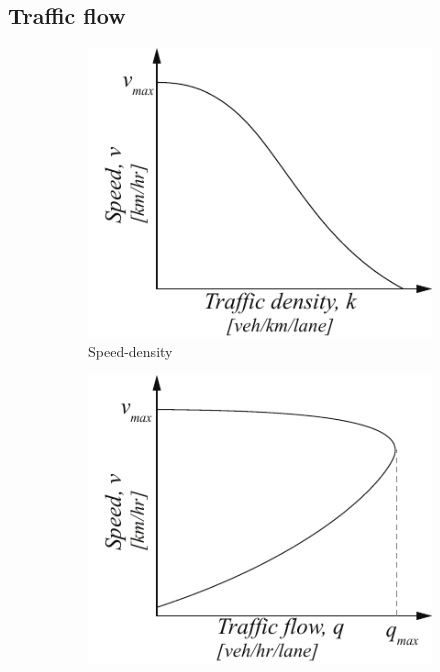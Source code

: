 \documentclass[10pt, letter, twocolumn]{article} %
\begin{document}
\subsection{Traffic flow}
\begin{figure}[ht!]
	\hfill
	\centering
	\begin{subfigure}[h]{0.25\linewidth}
		\centering
		\includegraphics[width=\textwidth]{figures/speeddensity}
		\caption{Speed-density}
		\label{fig:speeddensity}
	\end{subfigure}
	\hfill
	\begin{subfigure}[h]{0.25\linewidth}
		\centering
		\includegraphics[width=\textwidth]{figures/speedflow}

\end{subfigure}
\end{figure}
\end{document}
